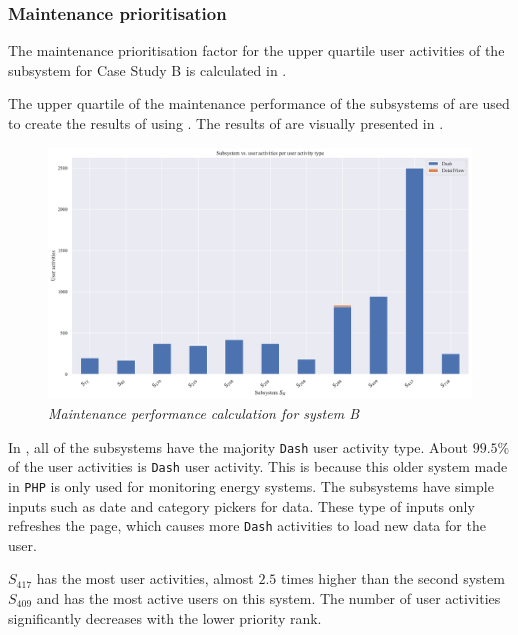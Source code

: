 \subsubsection{Maintenance prioritisation}
The maintenance prioritisation factor for the upper quartile user activities of the subsystem for Case Study B is calculated in .



The upper quartile of the maintenance performance of the subsystems of  are used to create the results of  using . The results of  are visually presented in .

\begin{figure}[!htb]
	\centering %
	\includegraphics[width=0.95\linewidth]{img/ch3/analysis/case_B_subsystems_1.pdf}
	\caption[Maintenance performance calculation for system B]
	{\textit{Maintenance performance calculation for system B}}\label{fig:ch3_systemsBBar}
\end{figure} 

In , all of the subsystems have the majority \texttt{Dash} user activity type. About $99.5\%$ of the user activities is \texttt{Dash} user activity. This is because this older system made in \texttt{PHP} is only used for monitoring energy systems. The subsystems have simple inputs such as date and category pickers for data. These type of inputs only refreshes the page, which causes more \texttt{Dash} activities to load new data for the user.\par $S_{417}$ has the most user activities, almost $2.5$ times higher than the second system $S_{409}$ and has the most active users on this system. The number of user activities significantly decreases with the lower priority rank.


